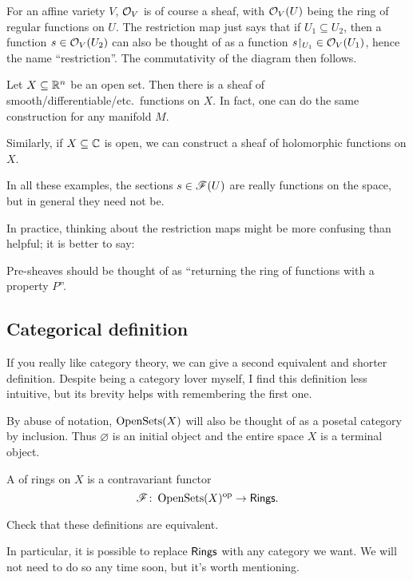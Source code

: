 \begin{example}
	\listhack
	\begin{enumerate}[(a)]
		\ii For an affine variety $V$, $\mathcal O_V$ is of course a sheaf,
		with $\mathcal O_V(U)$ being the ring of regular functions on $U$.
		The restriction map just says that if $U_1 \subseteq U_2$,
		then a function $s \in \mathcal O_V(U_2)$ can also be thought of as
		a function $s \restrict{U_1} \in \OO_V(U_1)$,
		hence the name ``restriction''.
		The commutativity of the diagram then follows.

		\ii Let $X \subseteq \mathbb R^n$ be an open set.
		Then there is a sheaf of smooth/differentiable/etc.\ functions on $X$.
		In fact, one can do the same construction for any manifold $M$.

		\ii Similarly, if $X \subseteq \mathbb C$ is open,
		we can construct a sheaf of holomorphic functions on $X$.
	\end{enumerate}
	In all these examples, the sections $s \in \mathscr F(U)$
	are really functions on the space, but in general they need not be.
\end{example}

In practice, thinking about the restriction maps
might be more confusing than helpful; it is better to say:
\begin{moral}
	Pre-sheaves should be thought of as
	``returning the ring of functions with a property $P$''.
\end{moral}

\subsection{Categorical definition}
If you really like category theory,
we can give a second equivalent and shorter definition.
Despite being a category lover myself,
I find this definition less intuitive,
but its brevity helps with remembering the first one.
\begin{abuse}
	By abuse of notation, $\operatorname{OpenSets}(X)$ will also be thought of as a
	posetal category by inclusion. Thus $\varnothing$ is an initial object
	and the entire space $X$ is a terminal object.
\end{abuse}
\begin{definition}
	A  of rings on $X$ is a contravariant functor
	\[ \mathscr F \colon \operatorname{OpenSets}(X)^{\mathrm{op}} \to \mathsf{Rings}. \]
\end{definition}
\begin{exercise}
	Check that these definitions are equivalent.
\end{exercise}
In particular, it is possible to replace $\mathsf{Rings}$ with any category we want.
We will not need to do so any time soon, but it's worth mentioning.


